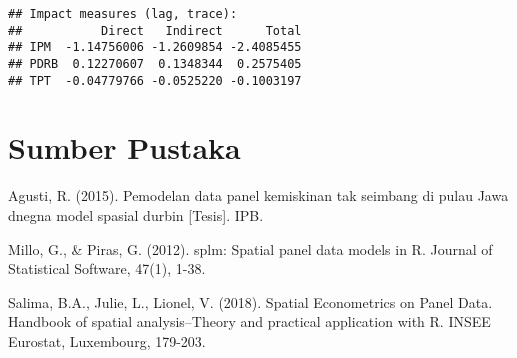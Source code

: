\documentclass[
]{book}
\begin{document}
\begin{verbatim}
## Impact measures (lag, trace):
##           Direct   Indirect      Total
## IPM  -1.14756006 -1.2609854 -2.4085455
## PDRB  0.12270607  0.1348344  0.2575405
## TPT  -0.04779766 -0.0525220 -0.1003197
\end{verbatim}

\hypertarget{sumber-pustaka-3}{%
\section{Sumber Pustaka}\label{sumber-pustaka-3}}

Agusti, R. (2015). Pemodelan data panel kemiskinan tak seimbang di pulau Jawa dnegna model spasial durbin {[}Tesis{]}. IPB.

Millo, G., \& Piras, G. (2012). splm: Spatial panel data models in R. Journal of Statistical Software, 47(1), 1-38.

Salima, B.A., Julie, L., Lionel, V. (2018). Spatial Econometrics on Panel Data. Handbook of spatial analysis--Theory and practical application with R. INSEE Eurostat, Luxembourg, 179-203.

  
\end{document}

